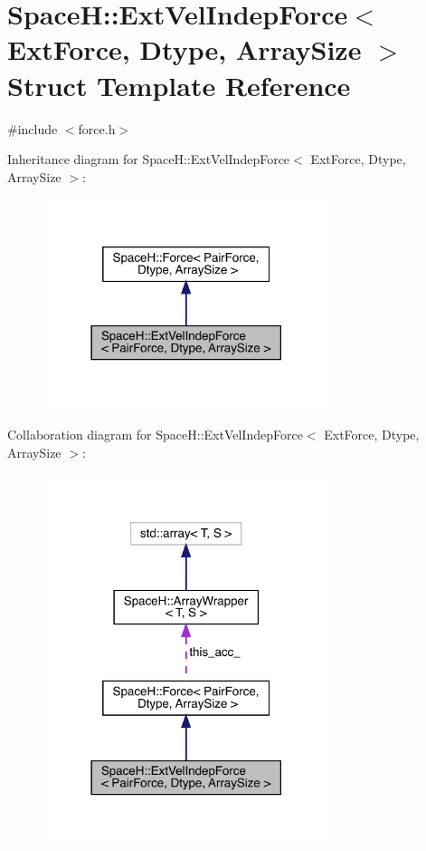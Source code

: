 \hypertarget{struct_space_h_1_1_ext_vel_indep_force}{}\section{SpaceH\+:\+:Ext\+Vel\+Indep\+Force$<$ Ext\+Force, Dtype, Array\+Size $>$ Struct Template Reference}
\label{struct_space_h_1_1_ext_vel_indep_force}


{\ttfamily \#include $<$force.\+h$>$}



Inheritance diagram for SpaceH\+:\+:Ext\+Vel\+Indep\+Force$<$ Ext\+Force, Dtype, Array\+Size $>$\+:\nopagebreak
\begin{figure}[H]
\begin{center}
\leavevmode
\includegraphics[width=237pt]{struct_space_h_1_1_ext_vel_indep_force__inherit__graph}
\end{center}
\end{figure}


Collaboration diagram for SpaceH\+:\+:Ext\+Vel\+Indep\+Force$<$ Ext\+Force, Dtype, Array\+Size $>$\+:\nopagebreak
\begin{figure}[H]
\begin{center}
\leavevmode
\includegraphics[width=237pt]{struct_space_h_1_1_ext_vel_indep_force__coll__graph}
\end{center}
\end{figure}
